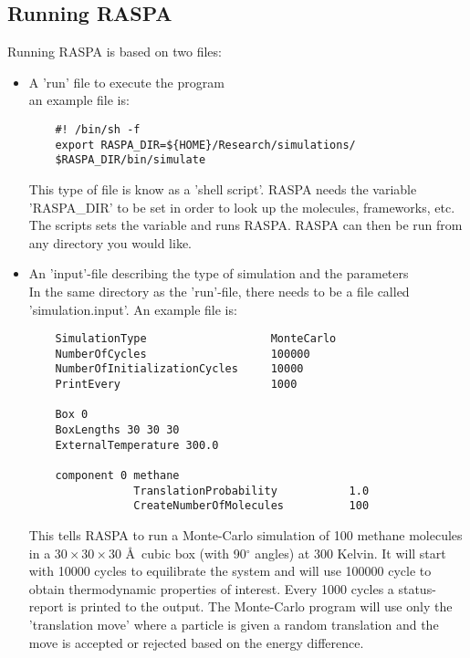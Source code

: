 \subsection{Running RASPA\label{Introduction: running RASPA}}
Running RASPA is based on two files:
\begin{itemize}
 \item{A 'run' file to execute the program}\\
  an example file is:
  \begin{verbatim}
    #! /bin/sh -f
    export RASPA_DIR=${HOME}/Research/simulations/
    $RASPA_DIR/bin/simulate
  \end{verbatim}
  This type of file is know as a 'shell script'. RASPA needs the variable 'RASPA\_DIR' to be set in order
  to look up the molecules, frameworks, etc. The scripts sets the variable and runs RASPA. RASPA can then be run
  from any directory you would like.
 \item{An 'input'-file describing the type of simulation and the parameters}\\
  In the same directory as the 'run'-file, there needs to be a file called 'simulation.input'. An example file is:
  \begin{verbatim}
    SimulationType                   MonteCarlo
    NumberOfCycles                   100000
    NumberOfInitializationCycles     10000
    PrintEvery                       1000

    Box 0
    BoxLengths 30 30 30
    ExternalTemperature 300.0

    component 0 methane
                TranslationProbability           1.0
                CreateNumberOfMolecules          100
  \end{verbatim}
  This tells RASPA to run a Monte-Carlo simulation of 100 methane molecules in a $30\times30\times30$ \AA\ cubic box (with 90$^\circ$ angles)
  at 300 Kelvin. It will start with 10000 cycles to equilibrate the system and will use 100000 cycle to obtain thermodynamic properties
  of interest. Every 1000 cycles a status-report is printed to the output. The Monte-Carlo program will use only the 'translation move'
  where a particle is given a random translation and the move is accepted or rejected based on the energy difference.
  \end{itemize}


